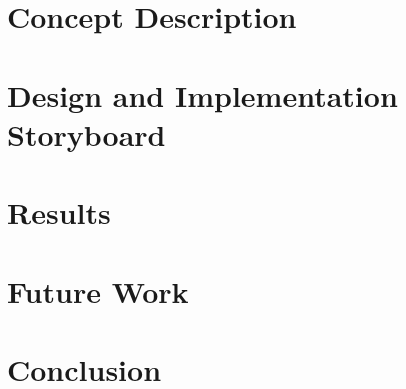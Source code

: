 \documentclass[a4paper, 12pt, oneside, BCOR1cm,toc=chapterentrywithdots]{scrbook}
\begin{document}
\chapter{Concept Description}
\chapter{Design and Implementation Storyboard}
\chapter{Results}
\chapter{Future Work}
\chapter{Conclusion}

\end{document}

